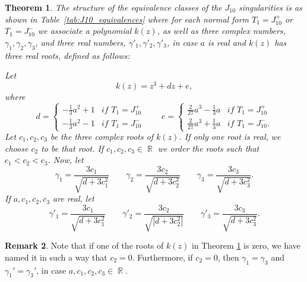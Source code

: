 \documentclass[noend]{amsproc}
\newtheorem{theorem}{Theorem}
\theoremstyle{definition}
\newtheorem{remark}[theorem]{Remark}
\DeclareMathOperator{\R}{\mathbb{R}}
\begin{document}
\begin{theorem}\label{tab:ThmJ10_equivalences}
The structure of the equivalence classes of the $J_{10}$ singularities is as shown
in Table~\ref{tab:J10_equivalences} where for each normal form $T_1=J_{10}^+$ or $T_1=J_{10}^-$ we associate a polynomial $k(z)$, as well as three complex numbers, $\gamma_1,\gamma_2,\gamma_3$, and three real numbers, $\gamma'_1,\gamma'_2,\gamma'_3$, in case $a$ is real and $k(z)$ has three real roots, defined as follows:

Let
\[k(z)=z^3+dz+e,\]
where 
\begin{equation*}
d=\left\{\begin{array}{ll}-\frac{1}{3}a^2+1&\textit{if $T_1=J_{10}^+$}\\-\frac{1}{3}a^2-1&\textit{if $T_1=J_{10}^-$}\end{array}\right.\qquad e=\left\{\begin{array}{ll}\frac{2}{27}a^3-\frac{1}{3}a&\textit{if $T_1=J_{10}^+$}\\\frac{2}{27}a^3+\frac{1}{3}a&\textit{if $T_1=J_{10}^-$.}\end{array}\right.
\end{equation*}
Let $c_1,c_2,c_3$ be the three complex roots of $k(z)$. If only one root is real, we choose $c_2$ to be that root. If $c_1,c_2,c_3\in\R$ we order the roots such that $c_1<c_2<c_3$. 
Now, let
\begin{equation*}
\gamma_1=\frac{3c_1}{\sqrt{d+3c_1^2}}\qquad\gamma_2=\frac{3c_2}{\sqrt{d+3c_2^2}}\qquad\gamma_3=\frac{3c_3}{\sqrt{d+3c_3^2}}.
\end{equation*}
If $a,c_1,c_2,c_3$ are real, let
\begin{equation*}
\gamma'_1=\frac{3c_1}{\sqrt{d+3c_1^2}}\qquad\gamma'_2=\frac{3c_2}{\sqrt{|d+3c_2^2|}}\qquad\gamma'_3=\frac{3c_3}{\sqrt{d+3c_3^2}}.
\end{equation*}
\end{theorem}
\begin{remark}
Note that if one of the roots of $k(z)$ in Theorem \ref{tab:ThmJ10_equivalences} is zero, we have named it in such a way that $c_2=0$. Furthermore, if $c_2=0$, then $\gamma_1=\gamma_3$ and $\gamma_1'=\gamma_3'$, in case $a,c_1,c_2,c_3\in\R$.
\end{remark}
\end{document}
